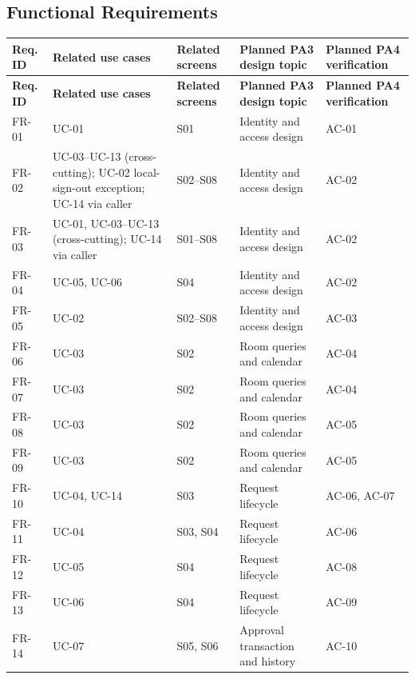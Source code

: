 \subsection{Functional Requirements}
\begingroup
\small
{}
\setlength{\tabcolsep}{3pt}
\renewcommand{\arraystretch}{1.1}
\begin{longtable}{|>{\raggedright\arraybackslash}p{}|>{\raggedright\arraybackslash}p{}|>{\raggedright\arraybackslash}p{}|>{\raggedright\arraybackslash}p{}|>{\raggedright\arraybackslash}p{}|}
\hline
\textbf{Req. ID} & \textbf{Related use cases} & \textbf{Related screens} & \textbf{Planned PA3 design topic} & \textbf{Planned PA4 verification} \\ \hline
\endfirsthead
\hline
\textbf{Req. ID} & \textbf{Related use cases} & \textbf{Related screens} & \textbf{Planned PA3 design topic} & \textbf{Planned PA4 verification} \\ \hline
\endhead
\hline
\endfoot
\hline
\endlastfoot
FR-01 & UC-01 & S01 & Identity and access design & AC-01 \\ \hline
FR-02 & UC-03--UC-13 (cross-cutting); UC-02 local-sign-out exception; UC-14 via caller & S02--S08 & Identity and access design & AC-02 \\ \hline
FR-03 & UC-01, UC-03--UC-13 (cross-cutting); UC-14 via caller & S01--S08 & Identity and access design & AC-02 \\ \hline
FR-04 & UC-05, UC-06 & S04 & Identity and access design & AC-02 \\ \hline
FR-05 & UC-02 & S02--S08 & Identity and access design & AC-03 \\ \hline
FR-06 & UC-03 & S02 & Room queries and calendar & AC-04 \\ \hline
FR-07 & UC-03 & S02 & Room queries and calendar & AC-04 \\ \hline
FR-08 & UC-03 & S02 & Room queries and calendar & AC-05 \\ \hline
FR-09 & UC-03 & S02 & Room queries and calendar & AC-05 \\ \hline
FR-10 & UC-04, UC-14 & S03 & Request lifecycle & AC-06, AC-07 \\ \hline
FR-11 & UC-04 & S03, S04 & Request lifecycle & AC-06 \\ \hline
FR-12 & UC-05 & S04 & Request lifecycle & AC-08 \\ \hline
FR-13 & UC-06 & S04 & Request lifecycle & AC-09 \\ \hline
FR-14 & UC-07 & S05, S06 & Approval transaction and history & AC-10 \\ \hline

\end{longtable}
